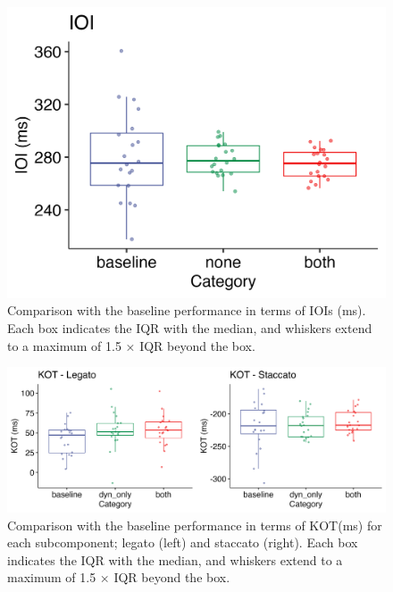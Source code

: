 \documentclass[
  man]{apa6}
\begin{document}
\begin{figure}
\includegraphics[width=1\linewidth]{manuscript_files/figure-latex/plot-ioi-2-1} \caption{\label{fig:ioi-2}Comparison with the baseline performance in terms of IOIs (ms). Each box indicates the IQR with the median, and whiskers extend to a maximum of 1.5 × IQR beyond the box.}\label{fig:plot-ioi-2}
\end{figure}

\begin{figure}
\includegraphics[width=1\linewidth]{manuscript_files/figure-latex/plot-kot-2-1} \caption{\label{fig:kot-2}Comparison with the baseline performance in terms of KOT(ms) for each subcomponent; legato (left) and staccato (right). Each box indicates the IQR with the median, and whiskers extend to a maximum of 1.5 × IQR beyond the box.}\label{fig:plot-kot-2}
\end{figure}
\end{document}
